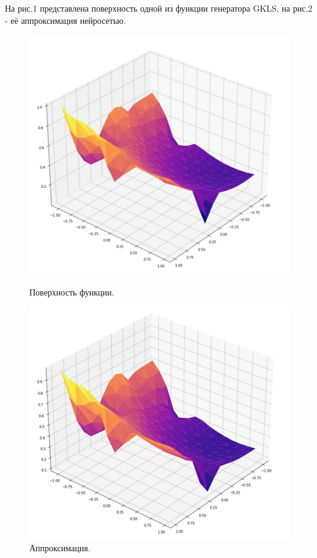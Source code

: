\documentclass[11pt, oneside, a4paper]{article}
\begin{document}
На рис.1 представлена поверхность одной из функции генератора GKLS, на рис.2 - её аппроксимация нейросетью.
\begin{figure}[!h]
	\begin{center}
		\begin{minipage}[h]{0.45\linewidth}
			\includegraphics[width=1\linewidth]{figure/1.png}
			\caption{Поверхность функции.} %
		\end{minipage}
		\hfill
		\begin{minipage}[!h]{0.45\linewidth}
			\includegraphics[width=1\linewidth]{figure/1_approx.png}
			\caption{Аппроксимация.}
		\end{minipage}
	\end{center}
\end{figure}	
\end{document}

